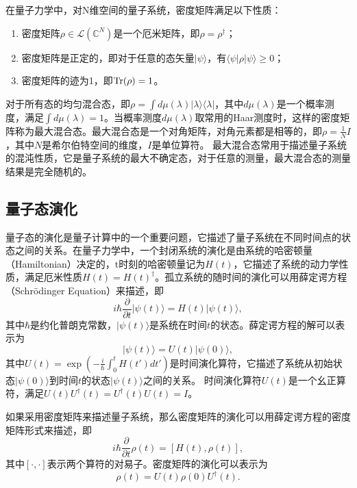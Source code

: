 在量子力学中，对N维空间的量子系统，密度矩阵满足以下性质：
\begin{enumerate}
    \item 密度矩阵$\rho\in \mathcal{L}(\mathbb{C}^N)$是一个厄米矩阵，即$\rho = \rho^\dagger$；
    \item 密度矩阵是正定的，即对于任意的态矢量$|\psi\rangle$，有$\langle\psi|\rho|\psi\rangle \geq 0$；
    \item 密度矩阵的迹为1，即$\Tr(\rho) = 1$。
\end{enumerate}

对于所有态的均匀混合态，即$\rho = \int d\mu(\lambda) |\lambda\rangle\langle\lambda|$，其中$d\mu(\lambda)$是一个概率测度，满足$\int d\mu(\lambda) = 1$。当概率测度$d\mu(\lambda)$取常用的Haar测度时，这样的密度矩阵称为最大混合态。最大混合态是一个对角矩阵，对角元素都是相等的，即$\rho = \frac{1}{N}I$，其中$N$是希尔伯特空间的维度，$I$是单位算符。
最大混合态常用于描述量子系统的混沌性质，它是量子系统的最大不确定态，对于任意的测量，最大混合态的测量结果是完全随机的。

\subsection{量子态演化}
量子态的演化是量子计算中的一个重要问题，它描述了量子系统在不同时间点的状态之间的关系。在量子力学中，一个封闭系统的演化是由系统的哈密顿量（Hamiltonian）决定的，t时刻的哈密顿量记为$H(t)$，它描述了系统的动力学性质，满足厄米性质$H(t) = H(t)^\dagger$。孤立系统的随时间的演化可以用薛定谔方程（Schrödinger Equation）来描述，即
\begin{equation}
    i\hbar\frac{\partial}{\partial t}|\psi(t)\rangle = H(t)|\psi(t)\rangle,
\end{equation}
其中$\hbar$是约化普朗克常数，$|\psi(t)\rangle$是系统在时间$t$的状态。薛定谔方程的解可以表示为
\begin{equation}
    |\psi(t)\rangle = U(t)|\psi(0)\rangle,
\end{equation}
其中$U(t) = \exp\left(-\frac{i}{\hbar}\int_0^t H(t')dt'\right)$是时间演化算符，它描述了系统从初始状态$|\psi(0)\rangle$到时间$t$的状态$|\psi(t)\rangle$之间的关系。
时间演化算符$U(t)$是一个幺正算符，满足$U(t)U^\dagger(t) = U^\dagger(t)U(t) = I$。


如果采用密度矩阵来描述量子系统，那么密度矩阵的演化可以用薛定谔方程的密度矩阵形式来描述，即
\begin{equation}
    i\hbar\frac{\partial}{\partial t}\rho(t) = [H(t), \rho(t)],
\end{equation}
其中$[\cdot, \cdot]$表示两个算符的对易子。密度矩阵的演化可以表示为
\begin{equation}
    \rho(t) = U(t)\rho(0)U^\dagger(t).
\end{equation}

